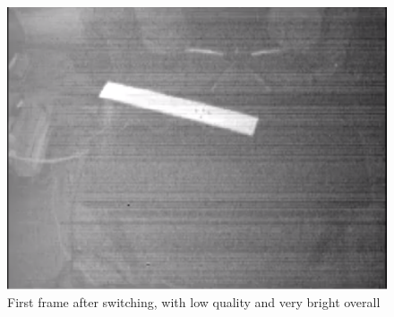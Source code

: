 \documentclass[10pt,twocolumn]{IEEEtran}
\begin{document}
\begin{figure}[ht]
    \centering
    \includegraphics[width = 0.8\linewidth]{first.png}
    \caption{First frame after switching, with low quality and very bright overall}
    \label{fig:w11_first}
\end{figure}

%
%
\end{document}
